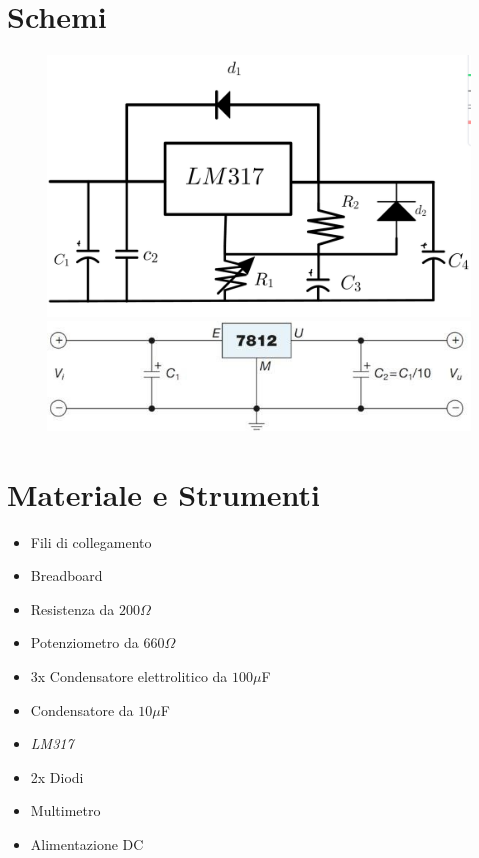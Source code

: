\documentclass[12pt]{article}
\begin{document}
    \section{Schemi} 
\begin{figure}[!h]
    \centering
    \includegraphics[scale=0.1]{schema.jpg}
    \includegraphics[scale=0.4]{schema2.jpg}
\end{figure}
    \section{Materiale e Strumenti}
    \begin{multicols}{2}
    \begin{itemize}
    \item Fili di collegamento
    \item Breadboard
    \item Resistenza da $200\Omega$
    \item Potenziometro da $660\Omega$
    \item 3x Condensatore elettrolitico da $100\mu$F
    \item Condensatore da $10\mu$F
    \item \textit{LM317}
    \item 2x Diodi
    \end{itemize}
    \vfill\null
    \columnbreak
    \begin{itemize}
    \item Multimetro
    \item Alimentazione DC 
    \end{itemize}
    \vfill\null
    \end{multicols}
\end{document}
